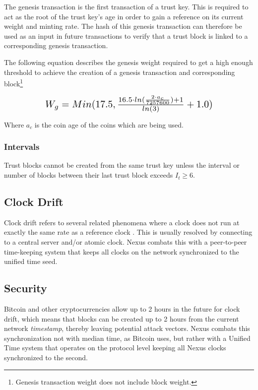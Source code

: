 \documentclass[11pt]{article}
\begin{document}
The genesis transaction is the first transaction of a trust key. 
This is required to act as the root of the trust key's age in order to gain a reference on its current weight and minting rate. 
The hash of this genesis transaction can therefore be used as an input in future transactions to verify that a trust block is linked to a corresponding genesis transaction.

\noindent The following equation describes the genesis weight required to get a high enough threshold to achieve the creation of a genesis transaction and corresponding block\footnote{Genesis transaction weight does not include block weight.}

\begin{equation}
\resizebox{.70\hsize}{!}{$
W_{g} = Min(17.5, \frac{16.5 \cdot ln(\frac{2 \cdot a_{c}}{7257600}) + 1}{ln(3)} + 1.0)
$}
\end{equation}

\noindent Where $a_c$ is the coin age of the coins which are being used.

\subsubsection{Intervals}
 
Trust blocks cannot be created from the same trust key unless the interval or number of blocks between their last trust block exceeds $I_{t} \geq 6$.

\subsection{Clock Drift}

Clock drift refers to several related phenomena where a clock does not run at exactly the same rate as a reference clock \cite{wikiclockdrift}.
This is usually resolved by connecting to a central server and/or atomic clock.
Nexus combats this with a peer-to-peer time-keeping system that keeps all clocks on the network synchronized to the unified time seed.

\subsection{Security}

Bitcoin and other cryptocurrencies allow up to 2 hours in the future for clock drift, which means that blocks can be created up to 2 hours from the current network \textit{timestamp}, thereby leaving potential attack vectors.
Nexus combats this synchronization not with median time, as Bitcoin uses, but rather with a Unified Time system that operates on the protocol level keeping all Nexus clocks synchronized to the second.
\end{document}
